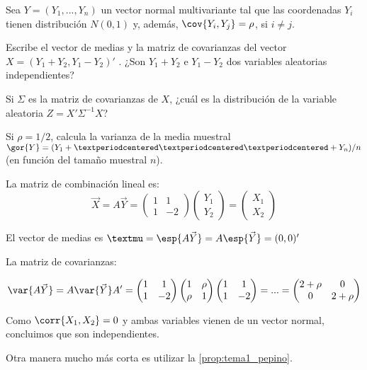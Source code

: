 \begin{problem}[8]
Sea $Y = (Y_1,...,Y_n)$ un vector normal multivariante tal que las coordenadas $Y_i$ tienen distribución
$N(0, 1)$ y, además, $\cov{Y_i , Y_j} = \rho$, si $i≠j$.

\ppart Escribe el vector de medias y la matriz de covarianzas del vector $X = (Y_1+Y_2,Y_1−Y_2)'$ . ¿Son $Y_1+Y_2 $ e $Y_1−Y_2$ dos variables aleatorias independientes?

\ppart Si $Σ$ es la matriz de covarianzas de $X$, ¿cuál es la distribución de la variable aleatoria $Z = X'Σ^{−1}X$?

\ppart Si $ρ = 1/2$, calcula la varianza de la media muestral $\gor{Y}= (Y_1 + · · · + Y_n )/n$ (en función del tamaño muestral $n$).

\solution
{}

\spart 
La matriz de combinación lineal es:
\[\vec{X} = A\vec{Y} = \begin{pmatrix}1&1\\1&-2\end{pmatrix}\begin{pmatrix}Y_1\\Y_2\end{pmatrix} = \begin{pmatrix}X_1\\X_2\end{pmatrix}\]

El vector de medias es $µ = \esp{A\vec{Y}} = A\esp{\vec{Y}} = (0,0)'$

La matriz de covarianzas:

\[
\var{A\vec{Y}} = A\var{\vec{Y}}A' = \begin{pmatrix}1&1\\1&-2\end{pmatrix}\begin{pmatrix}1&\rho\\\rho&1\end{pmatrix}\begin{pmatrix}1&1\\1&-2\end{pmatrix} = ... = \begin{pmatrix}2+\rho&0\\0&2+\rho \end{pmatrix}
\]

Como $\corr{X_1,X_2} = 0$ y ambas variables vienen de un vector normal, concluimos que son independientes.


Otra manera mucho más corta es utilizar la \ref{prop:tema1_pepino}.


\end{problem}
